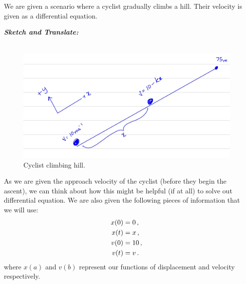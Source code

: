 \begin{subquestions}


\subquestion
We are given a scenario where a cyclist gradually climbs a hill. Their velocity is given as a differential equation.

\begin{subsubquestions}
	
\subsubquestion

\textbf{\textit{Sketch and Translate:}} \\ \\
\begin{figure}[H]
	\begin{center}
		\includegraphics[scale=0.25]{../2013/figures/2013q5-3}
		\caption{\label{2013:q5:Sketch3} Cyclist climbing hill.}
	\end{center}
\end{figure}
As we are given the approach velocity of the cyclist (before they begin the ascent), we can think about how this might be helpful (if at all) to solve out differential equation.
We are also given the following pieces of information that we will use: 
\begin{align}
	x(0) &= 0 \,,\nonumber \\
	x(t) &= x \,,\nonumber \\
	v(0) &= 10 \,,\nonumber \\
	v(t) &= v \,.
\end{align}
where $x(a)$ and $v(b)$ represent our functions of displacement and velocity respectively.
	
	
	

\end{subsubquestions}
\end{subquestions}
